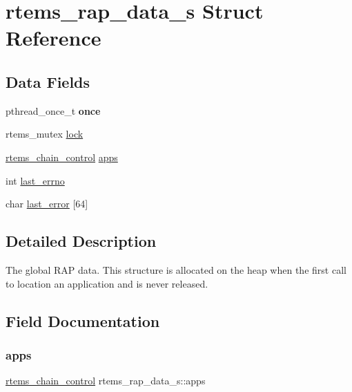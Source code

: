 \hypertarget{structrtems__rap__data__s}{}\section{rtems\+\_\+rap\+\_\+data\+\_\+s Struct Reference}
\label{structrtems__rap__data__s}
\subsection*{Data Fields}
\begin{DoxyCompactItemize}
\item 
\mbox{\label{structrtems__rap__data__s_a077f3c7c7c4b810ef34a545c98f650e6}} 
pthread\+\_\+once\+\_\+t {\bfseries once}
\item 
rtems\+\_\+mutex \mbox{\hyperlink{structrtems__rap__data__s_a2699326819c2d37fd7345cfc6359ef24}{lock}}
\item 
\mbox{\hyperlink{unionChain__Control}{rtems\+\_\+chain\+\_\+control}} \mbox{\hyperlink{structrtems__rap__data__s_a78ba28810d9bc6c74f29b3e2a87c88a5}{apps}}
\item 
int \mbox{\hyperlink{structrtems__rap__data__s_aea9f935a1e904b592f47926f182f7d18}{last\+\_\+errno}}
\item 
char \mbox{\hyperlink{structrtems__rap__data__s_a3efca1ed18363f32b766aff1d434622c}{last\+\_\+error}} \mbox{[}64\mbox{]}
\end{DoxyCompactItemize}


\subsection{Detailed Description}
The global R\+AP data. This structure is allocated on the heap when the first call to location an application and is never released. 

\subsection{Field Documentation}
\mbox{\label{structrtems__rap__data__s_a78ba28810d9bc6c74f29b3e2a87c88a5}} 
\subsubsection{\texorpdfstring{apps}{apps}}
{\footnotesize\ttfamily \mbox{\hyperlink{unionChain__Control}{rtems\+\_\+chain\+\_\+control}} rtems\+\_\+rap\+\_\+data\+\_\+s\+::apps}

